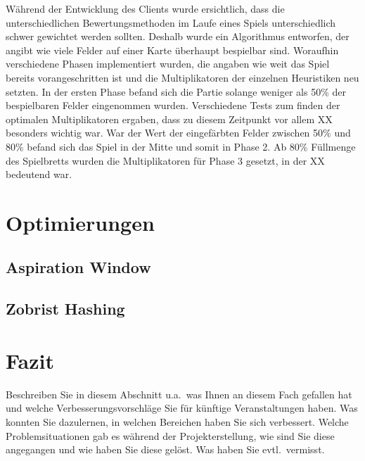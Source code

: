 \documentclass[12pt,a4paper,bibliography=totocnumbered,listof=totocnumbered]{article}
\begin{document}
Während der Entwicklung des Clients wurde ersichtlich, dass die unterschiedlichen Bewertungsmethoden im Laufe eines Spiels unterschiedlich schwer gewichtet werden sollten. Deshalb wurde ein Algorithmus entworfen, der angibt wie viele Felder auf einer Karte überhaupt bespielbar sind. Woraufhin verschiedene Phasen implementiert wurden, die angaben wie weit das Spiel bereits vorangeschritten ist und die Multiplikatoren der einzelnen Heuristiken neu setzten. In der ersten Phase befand sich die Partie solange weniger als 50\% der bespielbaren Felder eingenommen wurden. Verschiedene Tests zum finden der optimalen Multiplikatoren ergaben, dass zu diesem Zeitpunkt vor allem XX besonders wichtig war. War der Wert der eingefärbten Felder zwischen 50\% und 80\% befand sich das Spiel in der Mitte und somit in Phase 2.
Ab 80\% Füllmenge des Spielbretts wurden die Multiplikatoren für Phase 3 gesetzt, in der XX bedeutend war.
 
\newpage
\section{Optimierungen}
\subsection{Aspiration Window}

\subsection{Zobrist Hashing}

\newpage
\section{Fazit}
Beschreiben Sie in diesem Abschnitt u.a.\ was Ihnen an diesem Fach gefallen hat und welche Verbesserungsvorschläge Sie für künftige Veranstaltungen haben. Was konnten Sie dazulernen, in welchen Bereichen haben Sie sich verbessert. Welche Problemsituationen gab es während der Projekterstellung, wie sind Sie diese angegangen und wie haben Sie diese gelöst. Was haben Sie evtl.\ vermisst.

\renewcommand\refname{Quellenverzeichnis}


\pagebreak
\end{document}
